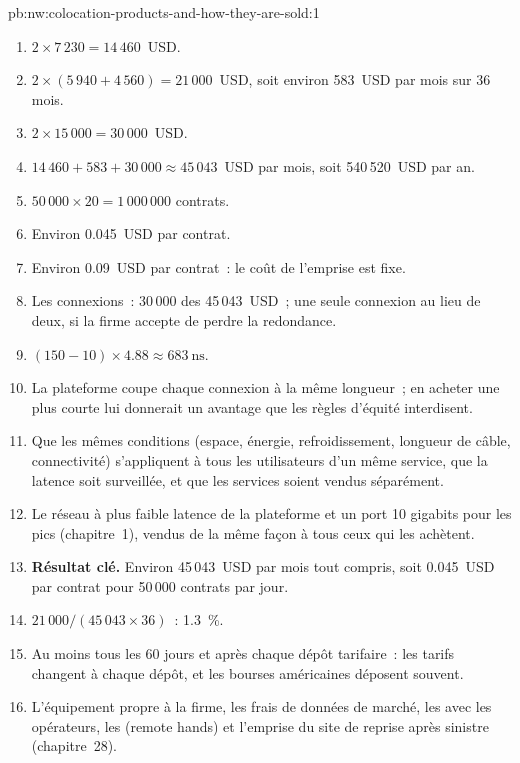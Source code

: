 \begin{solution}{pb:nw:colocation-products-and-how-they-are-sold:1}
\begin{enumerate}
\item $2 \times 7\,230 = 14\,460$~USD.
\item $2 \times (5\,940 + 4\,560) = 21\,000$~USD, soit environ 583~USD par mois sur 36 mois.
\item $2 \times 15\,000 = 30\,000$~USD.
\item $14\,460 + 583 + 30\,000 \approx 45\,043$~USD par mois, soit 540\,520~USD par an.
\item $50\,000 \times 20 = 1\,000\,000$ contrats.
\item Environ 0.045~USD par contrat.
\item Environ 0.09~USD par contrat~: le coût de l'emprise est fixe.
\item Les connexions~: 30\,000 des 45\,043~USD~; une seule connexion au lieu de deux, si la firme accepte de perdre la redondance.
\item $(150 - 10) \times 4.88 \approx \qty{683}{\nano\second}$.
\item La plateforme coupe chaque connexion à la même longueur~; en acheter une plus courte lui donnerait un avantage que les règles d'équité interdisent.
\item Que les mêmes conditions (espace, énergie, refroidissement, longueur de câble, connectivité) s'appliquent à tous les utilisateurs d'un même service, que la latence soit
  surveillée, et que les services soient vendus séparément.
\item Le réseau à plus faible latence de la plateforme et un port 10 gigabits pour les pics (chapitre~1), vendus de la même façon à tous ceux qui les achètent.
\item \textbf{Résultat clé.} Environ 45\,043~USD par mois tout compris, soit 0.045~USD par contrat pour 50\,000 contrats par jour.
\item $21\,000 / (45\,043 \times 36)$~: 1.3~\%.
\item Au moins tous les 60 jours et après chaque dépôt tarifaire~: les tarifs changent à chaque dépôt, et les bourses américaines déposent souvent.
\item L'équipement propre à la firme, les frais de données de marché, les  avec les opérateurs, les  (remote hands) et l'emprise du site de
  reprise après sinistre (chapitre~28).

\end{enumerate}
\end{solution}
